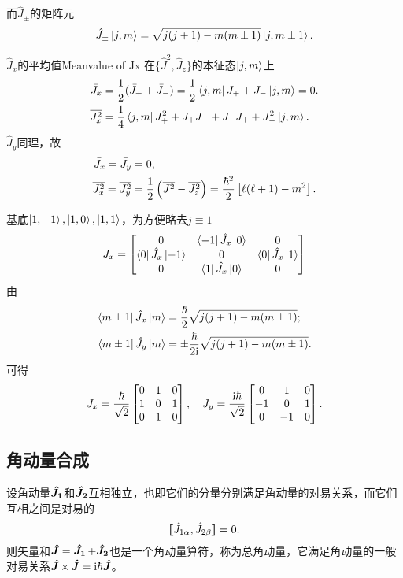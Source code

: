 而$\hat J_\pm$的矩阵元
\begin{align}
	\hat J_\pm\left\vert j,m\right\rangle=\sqrt{j(j+1)-m(m\pm 1)}\left\vert j,m\pm 1\right\rangle.
\end{align}
\begin{example}{$\hat J_x$的平均值}{Meanvalue of Jx}
	在$\{\hat J^2,\hat J_z\}$的本征态$\left\vert j,m\right\rangle$上
	\begin{align*}
		\bar J_x&=\frac12(\bar J_++\bar J_-)=\frac12\left\langle j,m\right\vert J_++J_-\left\vert j,m\right\rangle=0.\\
		\overline{J_x^2}&=\frac14\left\langle j,m\right\vert J_+^2+J_+J_-+J_-J_++J_-^2\left\vert j,m\right\rangle.
	\end{align*}
	$\hat J_y$同理，故
	\begin{align*}
		\bar J_x=\bar J_y&=0,\\
		\overline{J_x^2}=\overline{J_y^2}&=\frac12\left(\overline{J^2}-\overline{J_z^2}\right)=\frac{\hbar^2}2\left[\ell(\ell+1)-m^2\right].
	\end{align*}
\end{example}
\begin{example}{}{}
	基底$\left\vert 1,-1\right\rangle,\left\vert 1,0\right\rangle,\left\vert 1,1\right\rangle$，为方便略去$j\equiv 1$ %
	\begin{align*}
		J_x=\begin{bmatrix}
			0&\left\langle -1\right\vert\hat J_x\left\vert 0\right\rangle&0\\
			\left\langle 0\right\vert\hat J_x\left\vert -1\right\rangle&0&\left\langle 0\right\vert\hat J_x\left\vert 1\right\rangle\\
			0&\left\langle 1\right\vert\hat J_x\left\vert 0\right\rangle&0
		\end{bmatrix}
	\end{align*}
	由
	\begin{align*}
		\left\langle m\pm 1\right\vert\hat J_x\left\vert m\right\rangle&=\frac\hbar{2}\sqrt{j(j+1)-m(m\pm 1)};\\
		\left\langle m\pm 1\right\vert\hat J_y\left\vert m\right\rangle&=\pm\frac\hbar{2\mathrm{i}}\sqrt{j(j+1)-m(m\pm 1)}.
	\end{align*}
	可得 
	\begin{align*}
		J_x=\frac\hbar{\sqrt2}\begin{bmatrix}
			0&1&0\\1&0&1\\0&1&0
		\end{bmatrix},\quad J_y=\frac{\mathrm{i}\hbar}{\sqrt2}\begin{bmatrix}
			0&1&0\\-1&0&1\\0&-1&0
		\end{bmatrix}.
	\end{align*}
\end{example}
\subsection{角动量合成}
设角动量$\bm{\hat J_1}\!\mathop{}$和$\bm{\hat J_2}\!\mathop{}$互相独立，也即它们的分量分别满足角动量的对易关系，而它们互相之间是对易的
\[\lfloor\hspace{-4.7 pt}\lceil \hat J_{1\alpha},\hat J_{2\beta}\rceil\hspace{-4.7 pt}\rfloor=0.\]
则矢量和$\bm{\hat J}\!\mathop{}=\bm{\hat J_1}\!\mathop{}+\bm{\hat J_2}\!\mathop{}$也是一个角动量算符，称为总角动量，它满足角动量的一般对易关系$\bm{\hat J}\!\mathop{}\times\,\bm{\hat J}\!\mathop{}=\mathrm{i}\hbar\bm{\hat J}\!\mathop{}$。

